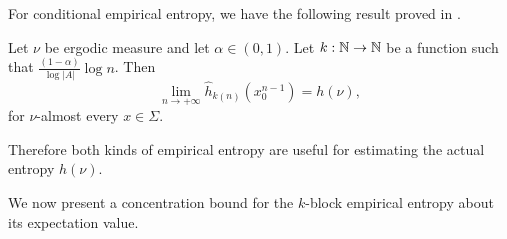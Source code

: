 For conditional empirical entropy, we have the following result proved in \cite[Theorem II.3.5]{shields:ergodic}.

\begin{theorem}
	 Let $\nu$ be ergodic measure and let $\alpha \in (0, 1)$. Let $k : \mathbb{N} \to \mathbb{N}$ be a function such that $\frac{(1 - \alpha)}{\log{|A|}}\log{n}$. Then
	 \[
	 	\lim_{n \to +\infty}{\hat{h}_{k(n)}(x_0^{n - 1})} = h(\nu),
	 \]
	 for $\nu$-almost every $x \in \Sigma$.
\end{theorem}

Therefore both kinds of empirical entropy are useful for estimating the actual entropy $h(\nu)$.

We now present a concentration bound for the $k$-block empirical entropy about its expectation value.

